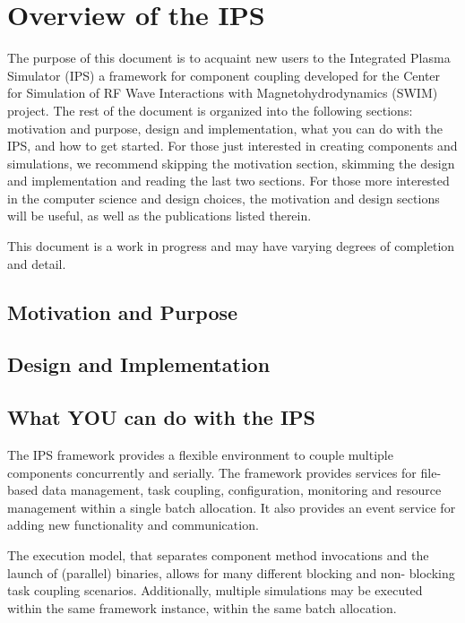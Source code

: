 \section{Overview of the IPS}
\label{sec:overview}

\par The purpose of this document is to acquaint new users to the Integrated 
Plasma Simulator (IPS) a framework for component coupling developed for 
the Center for Simulation of RF Wave Interactions with 
Magnetohydrodynamics (SWIM) project.  The rest of the document is 
organized into the following sections: motivation and purpose, design and 
implementation, what you can do with the IPS, and how to get started.  For 
those just interested in creating components and simulations, we recommend 
skipping the motivation section, skimming the design and implementation 
and reading the last two sections.  For those more interested in the 
computer science and design choices, the motivation and design sections 
will be useful, as well as the publications listed therein.

\par This document is a work in progress and may have varying degrees of 
completion and detail.

\subsection{Motivation and Purpose}
\label{sec:motivation}

\subsection{Design and Implementation}
\label{sec:design}


\subsection{What YOU can do with the IPS}
\label{sec:usecases}

\par The IPS framework provides a flexible environment to couple multiple 
components concurrently and serially.  The framework provides services for  
file-based data management, task coupling, configuration, monitoring and 
resource management within a single batch allocation.  It also provides an 
event service for adding new functionality and communication.

\par The execution model, that separates component method invocations and the 
launch of (parallel) binaries, allows for many different blocking and non-
blocking task coupling scenarios.  Additionally, multiple simulations may 
be executed within the same framework instance, within the same batch 
allocation.  

